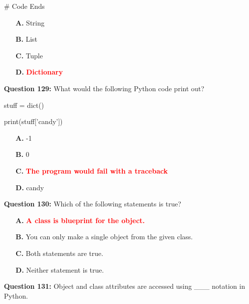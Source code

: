 \documentclass[12pt,a4paper]{article}
\begin{document}
\newline
# Code Ends

\begin{itemize}
    \item[\textbf{A.}] String
    \item[\textbf{B.}] List
    \item[\textbf{C.}] Tuple
    \item[\textbf{D.}] \textcolor{red}{\textbf{Dictionary}}
\end{itemize}

\vspace{0.5cm}

\textbf{Question 129:} What would the following Python code print out?\newline

\newline
\newline

\newline
stuff = dict()\newline

\newline
print(stuff['candy'])

\begin{itemize}
    \item[\textbf{A.}] -1
    \item[\textbf{B.}] 0
    \item[\textbf{C.}] \textcolor{red}{\textbf{The program would fail with a traceback}}
    \item[\textbf{D.}] candy
\end{itemize}

\vspace{0.5cm}

\textbf{Question 130:} Which of the following statements is true?

\begin{itemize}
    \item[\textbf{A.}] \textcolor{red}{\textbf{A class is blueprint for the object.}}
    \item[\textbf{B.}] You can only make a single object from the given class.
    \item[\textbf{C.}] Both statements are true.
    \item[\textbf{D.}] Neither statement is true.
\end{itemize}

\vspace{0.5cm}

\textbf{Question 131:} Object and class attributes are accessed using ___ notation in Python.
\end{document}
